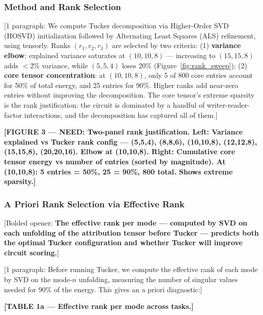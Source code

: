 \documentclass[11pt]{article}
\begin{document}

\subsubsection{Method and Rank Selection}

[1 paragraph: We compute Tucker decomposition via Higher-Order SVD (HOSVD)
initialization followed by Alternating Least Squares (ALS) refinement,
using tensorly. Ranks $(r_1, r_2, r_3)$ are selected by two criteria:
(1) \textbf{variance elbow}: explained variance saturates at $(10, 10, 8)$
--- increasing to $(15, 15, 8)$ adds $<$2\% variance, while $(5, 5, 4)$
loses 20\% (Figure~\ref{fig:rank_sweep}); (2) \textbf{core tensor
concentration}: at $(10, 10, 8)$, only 5 of 800 core entries account for
50\% of total energy, and 25 entries for 90\%. Higher ranks add near-zero
entries without improving the decomposition. The core tensor's extreme
sparsity is the rank justification: the circuit is dominated by a handful
of writer-reader-factor interactions, and the decomposition has captured
all of them.]

\textbf{[FIGURE 3 --- NEED: Two-panel rank justification.
Left: Variance explained vs Tucker rank config ---
(5,5,4), (8,8,6), (10,10,8), (12,12,8), (15,15,8), (20,20,16).
Elbow at (10,10,8).
Right: Cumulative core tensor energy vs number of entries (sorted by
magnitude). At (10,10,8): 5 entries = 50\%, 25 = 90\%, 800 total.
Shows extreme sparsity.]}

\subsubsection{A Priori Rank Selection via Effective Rank}

[Bolded opener: \textbf{The effective rank per mode --- computed by SVD
on each unfolding of the attribution tensor before Tucker --- predicts
both the optimal Tucker configuration and whether Tucker will improve
circuit scoring.}]

[1 paragraph: Before running Tucker, we compute the effective rank of
each mode by SVD on the mode-$n$ unfolding, measuring the number of
singular values needed for 90\% of the energy. This gives an a priori
diagnostic:]

\textbf{[TABLE 1a --- Effective rank per mode across tasks.]}
\end{document}
